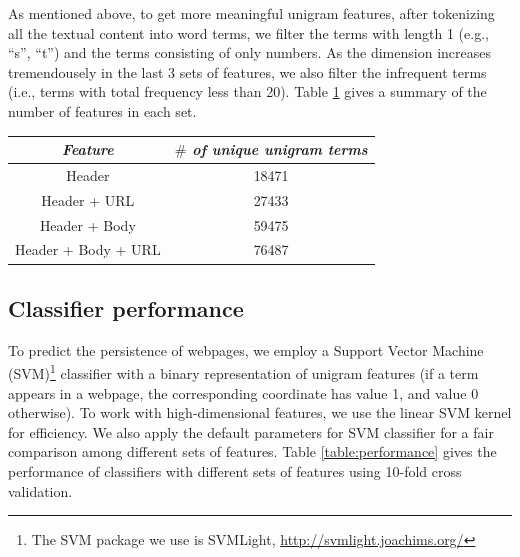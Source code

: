 \documentclass[phd,tocprelim]{cornell}
\renewcommand{\caption}[1]{\singlespacing\hangcaption{#1}\normalspacing}
\begin{document}
As mentioned above, to get more meaningful unigram features, after tokenizing all the textual content into word terms, we filter the terms with length 1 (e.g., ``s'', ``t'') and the terms consisting of only numbers. As the dimension increases tremendousely in the last 3 sets of features, we also filter the infrequent terms (i.e., terms with total frequency less than 20). Table \ref{table:feature-sets} gives a summary of the number of features in each set.

\begin{table}[t]
\centering
\caption{Feature size}
\label{table:feature-sets}
\begin{tabular}{c|c}
\hline
 \emph{Feature} & \emph{$\#$ of unique unigram terms} \\
\hline
Header & 18471  \\
\hline
Header + URL & 27433 \\
\hline
Header + Body & 59475 \\
\hline
Header + Body + URL & 76487\\
\hline
\end{tabular}
\end{table}

\subsection{Classifier performance}
To predict the persistence of webpages, we employ a Support Vector Machine (SVM)\footnote{The SVM package we use is SVMLight, \url{http://svmlight.joachims.org/}} classifier with a binary representation of unigram features (if a term appears in a webpage, the corresponding coordinate has value 1, and value 0 otherwise). To work with high-dimensional features, we use the linear SVM kernel for efficiency. 
We also apply the default parameters for SVM classifier for a fair comparison among different sets of features. Table \ref{table:performance} gives the performance of classifiers with different sets of features using 10-fold cross validation. 

\end{document}
